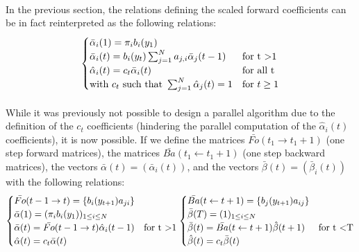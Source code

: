\paragraph{}
In the previous section, the relations defining the scaled forward coefficients can be in fact reinterpreted as the following relations:
\begin{equation}
\begin{cases}
\bar{\alpha}_i(1) = \pi_i b_i(y_1) & \\
\bar{\alpha}_i(t) = b_i(y_t)\sum_{j=1}^{N}{a_{j,i}\bar{\alpha}_j(t-1)} & \text{for t \textgreater 1} \\
\hat{\alpha}_i(t) = c_t \bar{\alpha}_i(t) & \text{for all t} \\
\text{with } c_t \text{ such that } \sum_{j=1}^{N}{\hat{\alpha}_j(t)} = 1 & \text{for }t \ge 1
\end{cases}
\end{equation}

\paragraph{}
While it was previously not possible to design a parallel algorithm due to the definition of the $c_t$ coefficients (hindering the parallel computation of the $\hat{\alpha}_i(t)$ coefficients), it is now possible. If we define the matrices $\bar{Fo}(t_1 \rightarrow t_1 + 1)$ (one step forward matrices), the matrices $\bar{Ba}( t_1 \leftarrow t_1 + 1)$ (one step backward matrices), the vectors $\bar{\alpha}(t)=(\bar{\alpha}_i(t))$, and the vectors $\bar{\beta}(t)=(\bar{\beta}_i(t))$ with the following relations:
\begin{equation}
\begin{cases}
\bar{Fo}( t - 1 \rightarrow t) =  \{b_i(y_{t+1})a_{ji}\} & \\
\bar{\alpha}(1) =  (\pi_i b_i(y_1))_{1 \le i \le N} & \\
\bar{\alpha}(t) =  \bar{Fo}( t - 1 \rightarrow t) \hat{\alpha}_i(t - 1) & \text{for t \textgreater 1} \\
\hat{\alpha}(t) = c_t \bar{\alpha}(t) &
\end{cases}
\begin{cases}
\bar{Ba}( t \leftarrow t + 1) = \{b_j(y_{t+1})a_{ij}\} & \\
\bar{\beta}(T) = (1)_{1 \le i \le N} & \\
\bar{\beta}(t) =  \bar{Ba}( t \leftarrow t + 1) \hat{\beta}(t + 1) & \text{for t \textless T} \\
\hat{\beta}(t) = c_t \bar{\beta}(t) &
\end{cases}
\end{equation}


